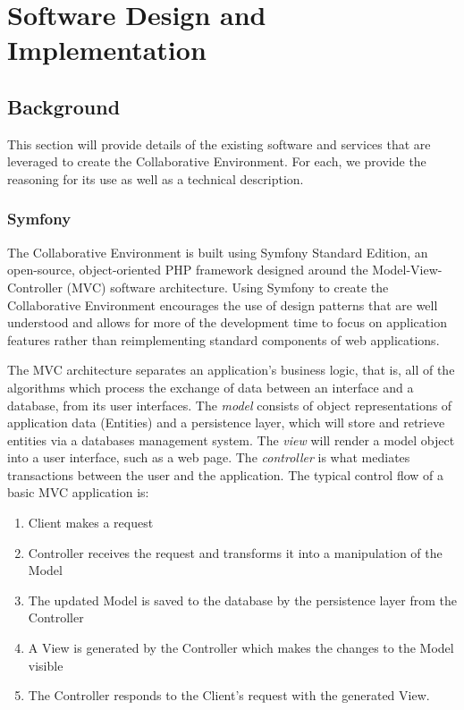 \chapter{Software Design and Implementation}
\label{chap:software-design}

\section{Background}
This section will provide details of the existing software and services that are leveraged to create the Collaborative Environment. For each, we provide the reasoning for its use as well as a technical description.

\subsection{Symfony}
The Collaborative Environment is built using Symfony Standard Edition, an open-source, object-oriented PHP framework designed around the Model-View-Controller (MVC) software architecture. Using Symfony to create the Collaborative Environment encourages the use of design patterns that are well understood and allows for more of the development time to focus on application features rather than reimplementing standard components of web applications.

The MVC architecture separates an application's business logic, that is, all of the algorithms which process the exchange of data between an interface and a database, from its user interfaces. The \emph{model} consists of object representations of application data (Entities) and a persistence layer, which will store and retrieve entities via a databases management system. The \emph{view} will render a model object into a user interface, such as a web page. The \emph{controller} is what mediates transactions between the user and the application. The typical control flow of a basic MVC application is:

\begin{singlespacing}
\begin{enumerate}
	\item Client makes a request
	\item Controller receives the request and transforms it into a manipulation of the Model
	\item The updated Model is saved to the database by the persistence layer from the Controller
	\item A View is generated by the Controller which makes the changes to the Model visible
	\item The Controller responds to the Client's request with the generated View.
\end{enumerate}
\end{singlespacing}

